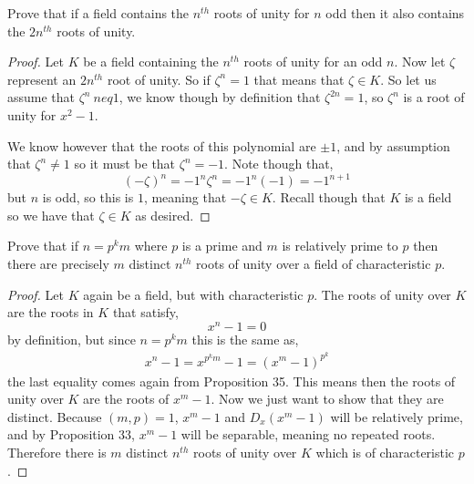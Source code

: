 \documentclass[11pt]{article}
\newenvironment{problem}[2][Problem\!]{\begin{trivlist}
\item[\hskip \labelsep {\bfseries #1}\hskip \labelsep {\bfseries #2}]}{\end{trivlist}}
\begin{document}
\begin{tcolorbox}
    \begin{problem}{13.6.3}
        Prove that if a field contains the $n^{th}$ roots of unity for $n$ odd then it also contains the $2n^{th}$ roots of unity.
    \end{problem}
\end{tcolorbox}
\begin{proof}
    Let $K$ be a field containing the $n^{th}$ roots of unity for an odd $n$. Now let $\zeta$ represent an $2n^{th}$ root of unity. So if $\zeta^{n} = 1$ that means that $\zeta \in K$. So let us assume that $\zeta^{n} \ neq 1$, we know though by definition that $\zeta^{2n} = 1$, so $\zeta^{n}$ is a root of unity for $x^{2} -1$. 

    We know however that the roots of this polynomial are $\pm1$, and by assumption that $\zeta^{n} \neq 1$ so it must be that $\zeta^{n} = -1$. Note though that,
    \[(-\zeta)^{n} = -1^{n}\zeta^{n} = -1^{n}(-1) = -1^{n + 1}\]
    but $n$ is odd, so this is $1$, meaning that $-\zeta \in K$. Recall though that $K$ is a field so we have that $\zeta\in K$ as desired. 
\end{proof}

\begin{tcolorbox}
    \begin{problem}{13.6.4}
        Prove that if $n= p^{k}m$ where $p$ is a prime and $m$ is relatively prime to $p$ then there are precisely $m$ distinct $n^{th}$ roots of unity over a field of characteristic $p$. 
    \end{problem}
\end{tcolorbox}
\begin{proof}
    Let $K$ again be a field, but with characteristic $p$. The roots of unity over $K$ are the roots in $K$ that satisfy,
    \[x^{n} -1 =0\]
    by definition, but since $n = p^{k}m$ this is the same as,
    \begin{align*}
        x^{n} -1 = x^{p^{k}m} - 1 = (x^{m} - 1)^{p^{k}}
    \end{align*}
    the last equality comes again from Proposition 35. This means then the roots of unity over $K$ are the roots of $x^{m} - 1$. Now we just want to show that they are distinct. Because $(m,p) =1$, $x^{m}-1$ and $D_x(x^{m} - 1)$ will be relatively prime, and by Proposition 33, $x^{m} - 1$ will be separable, meaning no repeated roots. Therefore there is $m$ distinct $n^{th}$ roots of unity over $K$ which is of characteristic $p$.
\end{proof}
\end{document}
